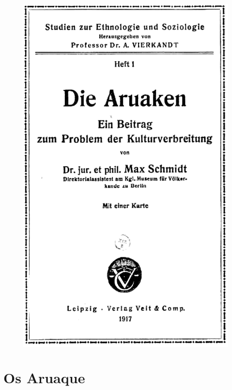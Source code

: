 \pagebreak
\thispagestyle{empty}

\begin{center}
\begin{figure}[H]
\begin{absolutelynopagebreak}
  \includegraphics[width=\textwidth]{./FRONTISPICIO.pdf}  

\end{absolutelynopagebreak}
\end{figure}
\end{center}

\part{Os Aruaque}
\pagestyle{baruch}

